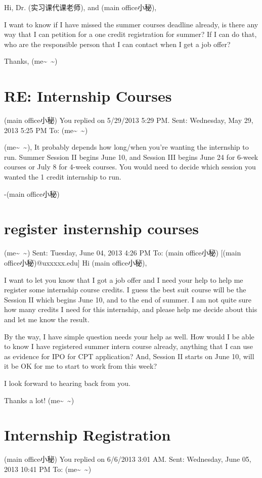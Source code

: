 \documentclass[12pt]{book}
\begin{document}
Hi, Dr. (实习课代课老师), and (main office小秘),

I want to know if I have missed the summer courses deadline already, is there any way that I can petition for a one credit registration for summer?
If I can do that, who are the responsible person that I can contact when I get a job offer?

Thanks,
(me\textasciitilde{}~\textasciitilde{})


\section{RE: Internship Courses}
\label{sec-41-2}
(main office小秘)
You replied on 5/29/2013 5:29 PM.
Sent:        Wednesday, May 29, 2013 5:25 PM
To:        (me\textasciitilde{}~\textasciitilde{})

(me\textasciitilde{}~\textasciitilde{}),
It probably depends how long/when you're wanting the internship to run.  Summer Session II begins June 10, and Session III begins June 24 for 6-week courses or July 8 for 4-week courses.
You would need to decide which session you wanted the 1 credit internship to run.

-(main office小秘)


\section{register insternship courses}
\label{sec-41-3}
(me\textasciitilde{}~\textasciitilde{})
Sent:        Tuesday, June 04, 2013 4:26 PM
To:        
(main office小秘) [(main office小秘)@uxxxxx.edu]
Hi (main office小秘), 

I want to let you know that I got a job offer and I need your help to help me register some internship course credits. I guess the best suit course will be the Session II which begins June 10, and to the end of summer. I am not quite sure how many credits I need for this internship, and please help me decide about this and let me know the result. 

By the way, I have simple question needs your help as well. How would I be able to know I have registered summer intern course already, anything that I can use as evidence for IPO for CPT application? And, Session II starts on June 10, will it be OK for me to start to work from this week?

I look forward to hearing back from you. 

Thanks a lot!
(me\textasciitilde{}~\textasciitilde{})


\section{Internship Registration}
\label{sec-41-4}
(main office小秘)
You replied on 6/6/2013 3:01 AM.
Sent:        Wednesday, June 05, 2013 10:41 PM
To: (me\textasciitilde{}~\textasciitilde{})
\end{document}
